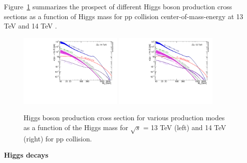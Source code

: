Figure~\ref{fig:higgs_productions_xs2} summarizes the prospect of different Higgs boson production cross sections 
as a function of Higgs mass for pp collision center-of-mass-energy at 13 TeV and 14 TeV \cite{deFlorian:2227475}. 
\begin{figure}[!htb]
  \centering
  \includegraphics[width=0.45\textwidth]{figures/Theory/plotAll_14tev_BSM_sqrt.pdf}
  \includegraphics[width=0.45\textwidth]{figures/Theory/plotAll_13tev_BSM_sqrt.pdf}
  \caption{Higgs boson production cross section for various production modes as a function of the Higgs mass for $\sqrt{s}$ = 13 TeV (left) and 14 TeV (right) for pp collision.}
  \label{fig:higgs_productions_xs2}
\end{figure}

\textbf{Higgs decays}

